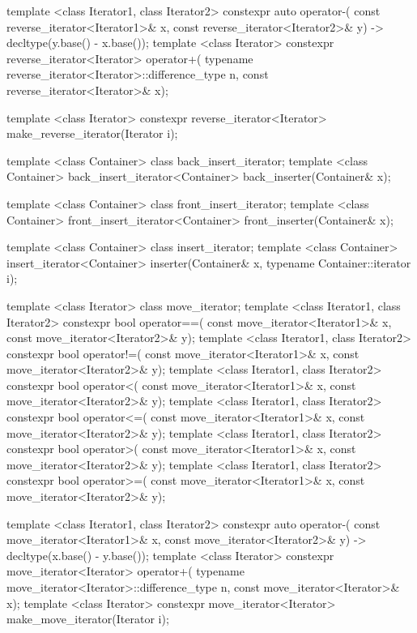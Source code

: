 \begin{codeblock}
{  template <class Iterator1, class Iterator2>
    constexpr auto operator-(
      const reverse_iterator<Iterator1>& x,
      const reverse_iterator<Iterator2>& y) -> decltype(y.base() - x.base());
  template <class Iterator>
    constexpr reverse_iterator<Iterator>
      operator+(
    typename reverse_iterator<Iterator>::difference_type n,
    const reverse_iterator<Iterator>& x);

  template <class Iterator>
    constexpr reverse_iterator<Iterator> make_reverse_iterator(Iterator i);

  template <class Container> class back_insert_iterator;
  template <class Container>
    back_insert_iterator<Container> back_inserter(Container& x);

  template <class Container> class front_insert_iterator;
  template <class Container>
    front_insert_iterator<Container> front_inserter(Container& x);

  template <class Container> class insert_iterator;
  template <class Container>
    insert_iterator<Container> inserter(Container& x, typename Container::iterator i);

  template <class Iterator> class move_iterator;
  template <class Iterator1, class Iterator2>
    constexpr bool operator==(
      const move_iterator<Iterator1>& x, const move_iterator<Iterator2>& y);
  template <class Iterator1, class Iterator2>
    constexpr bool operator!=(
      const move_iterator<Iterator1>& x, const move_iterator<Iterator2>& y);
  template <class Iterator1, class Iterator2>
    constexpr bool operator<(
      const move_iterator<Iterator1>& x, const move_iterator<Iterator2>& y);
  template <class Iterator1, class Iterator2>
    constexpr bool operator<=(
      const move_iterator<Iterator1>& x, const move_iterator<Iterator2>& y);
  template <class Iterator1, class Iterator2>
    constexpr bool operator>(
      const move_iterator<Iterator1>& x, const move_iterator<Iterator2>& y);
  template <class Iterator1, class Iterator2>
    constexpr bool operator>=(
      const move_iterator<Iterator1>& x, const move_iterator<Iterator2>& y);

  template <class Iterator1, class Iterator2>
    constexpr auto operator-(
    const move_iterator<Iterator1>& x,
    const move_iterator<Iterator2>& y) -> decltype(x.base() - y.base());
  template <class Iterator>
    constexpr move_iterator<Iterator> operator+(
      typename move_iterator<Iterator>::difference_type n, const move_iterator<Iterator>& x);
  template <class Iterator>
    constexpr move_iterator<Iterator> make_move_iterator(Iterator i);

}
\end{codeblock}
